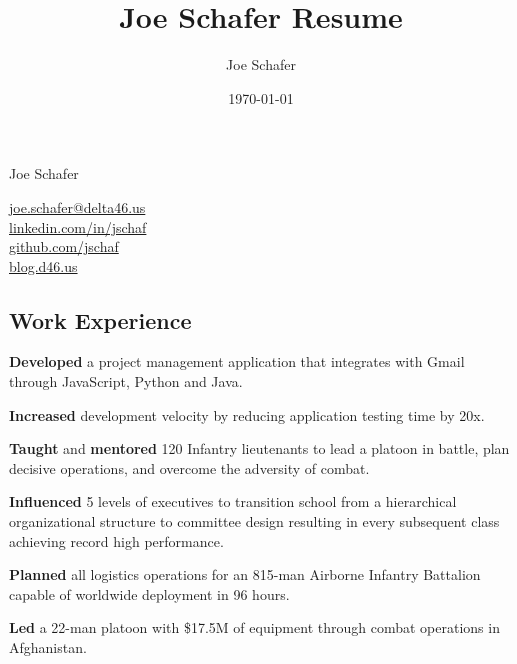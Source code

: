 \documentclass[letterpaper,11pt]{jschaf-resume}
\title{Joe Schafer Resume}
\author{Joe Schafer}
\date{\today}
\makeatletter
\newcommand*{\emailLink}{\href{mailto:joe.schafer@delta46.us}{joe.schafer@delta46.us}}
\newcommand*{\linkedInLink}{\href{http://linkedin.com/in/jschaf}{linkedin.com/in/jschaf}}
\newcommand*{\githubLink}{\href{http://github.com/jschaf}{github.com/jschaf}}
\newcommand*{\blogLink}{\href{http://blog.d46.us}{blog.d46.us}}
\newcommand*{\action}[1]{\textbf{#1}}
\makeatother
\begin{document}

\setlength{\columnsep}{3em}

\begin{paracol}{2}
{\fontfamily{\sfdefault}\fontsize{36px}{48px}\selectfont Joe Schafer}

\switchcolumn

\emailLink\\
\linkedInLink\\
\githubLink\\
\blogLink\\

\end{paracol}


\begin{paracol}{2}

\section*{Work Experience}

\begin{workitems}
  \item \action{Developed} a project management application that integrates with Gmail
    through JavaScript, Python and Java.
  \item \action{Increased} development velocity by reducing application testing time by
    20x.
\end{workitems}

\begin{workitems}
\item \action{Taught} and \action{mentored} 120 Infantry lieutenants to lead a
  platoon in battle, plan decisive operations, and overcome the adversity of
  combat.
\item \action{Influenced} 5 levels of executives to transition school from a
  hierarchical organizational structure to committee design resulting in every
  subsequent class achieving record high performance.
\end{workitems}

\begin{workitems}
\item \action{Planned} all logistics operations for an 815-man Airborne Infantry
  Battalion capable of worldwide deployment in 96 hours.

\item \action{Led} a 22-man platoon with \$17.5M of equipment through combat operations
  in Afghanistan.


\end{workitems}
\end{paracol}
\end{document}

